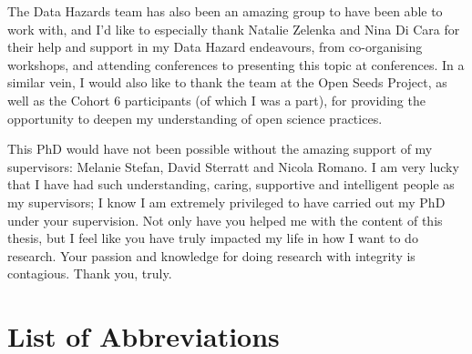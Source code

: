 \documentclass[
  11pt,
  letterpaper,
]{scrreprt}
\begin{document}
The Data Hazards team has also been an amazing group to have been able
to work with, and I'd like to especially thank Natalie Zelenka and Nina
Di Cara for their help and support in my Data Hazard endeavours, from
co-organising workshops, and attending conferences to presenting this
topic at conferences. In a similar vein, I would also like to thank the
team at the Open Seeds Project, as well as the Cohort 6 participants (of
which I was a part), for providing the opportunity to deepen my
understanding of open science practices.

This PhD would have not been possible without the amazing support of my
supervisors: Melanie Stefan, David Sterratt and Nicola Romano. I am very
lucky that I have had such understanding, caring, supportive and
intelligent people as my supervisors; I know I am extremely privileged
to have carried out my PhD under your supervision. Not only have you
helped me with the content of this thesis, but I feel like you have
truly impacted my life in how I want to do research. Your passion and
knowledge for doing research with integrity is contagious. Thank you,
truly.

\clearpage
{
\hypersetup{linkcolor=black}
\setcounter{tocdepth}{3}
\tableofcontents
\listoffigures
}


\chapter*{List of Abbreviations}\label{list-of-abbreviations}


\noindent
\end{document}

